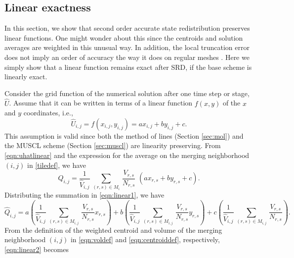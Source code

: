 \subsection{Linear exactness} \label{sec:linex}
In this section, we show that second order accurate state redistribution preserves linear functions.
One might wonder about this since the centroids and solution averages are weighted in this unusual way.
In addition, the local truncation error does not imply an order of
accuracy the way it does on regular meshes \cite{Kreiss:white2}. 
Here we simply show that a
linear function remains exact after SRD, if the base scheme is linearly
exact.

Consider the grid function of the numerical solution after one time step
or stage, $\widehat{U}$.  Assume that it can be written in terms of a linear function $f(x,y)$ of the $x$ and $y$ coordinates, i.e.,
\begin{equation}
    \label{eqn:uhatlinear}
\widehat{U}_{i,j} = f(x_{i,j},y_{i,j}) = ax_{i,j} + by_{i,j} + c.
\end{equation}
This assumption is valid since both the method of lines (Section \ref{sec:mol}) and the MUSCL scheme (Section \ref{sec:muscl}) are linearity preserving.  
From \eqref{eqn:uhatlinear} and the expression for the average on the merging neighborhood $(i,j)$ in \eqref{tiledef}, we have
\begin{equation}
    \label{eqn:linear1}
\widehat{Q}_{i,j} = \frac{1}{{\widehat V}_{i,j}} \, \sum_{(r,s) \in M_i} \,  
\frac{V_{r,s}}{N_{r,s}}  \,\, (ax_{r,s} + by_{r,s} + c).
\end{equation}
Distributing the summation in \eqref{eqn:linear1}, we have
\begin{equation}\label{eqn:linear2}
\widehat{Q}_{i,j} =  a \left(\frac{1}{{\widehat V}_{i,j}} \, \sum_{(r,s) \in M_{i,j}} \,  
\frac{V_{r,s}}{N_{r,s}} x_{r,s} \right) + b\left(\frac{1}{{\widehat V}_{i,j}} \, \sum_{(r,s) \in M_{i,j}} \,  
\frac{V_{r,s}}{N_{r,s}} y_{r,s} \right) + c\left(\frac{1}{{\widehat V}_{i,j}} \, \sum_{(r,s) \in M_{i,j}} \,
\frac{V_{r,s}}{N_{r,s}}\right) .
\end{equation}
From the definition of the weighted centroid and volume of the merging neighborhood
$(i,j)$ in \eqref{eqn:voldef} and \eqref{eqn:centroiddef}, respectively, \eqref{eqn:linear2} becomes
